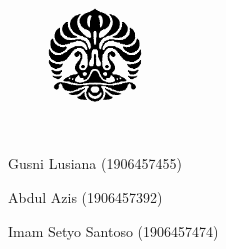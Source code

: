 \begin{titlepage}
    \begin{center}    
        \begin{figure}
            \begin{center}
                \includegraphics[width=2.5cm]{pics/makara.png}
            \end{center}
        \end{figure}    
        \vspace*{0cm}
        
        \vspace*{1.0cm}
        \bo{\Judul} \\[1.0cm]

        \vspace*{2.5 cm} 
        \bo{\Type}

        \vspace*{2 cm}
       	\item Gusni Lusiana (1906457455)
        \item Abdul Azis (1906457392)
       \item Imam Setyo Santoso (1906457474)

        \vspace*{5.0cm}
    \end{center}
\end{titlepage}
